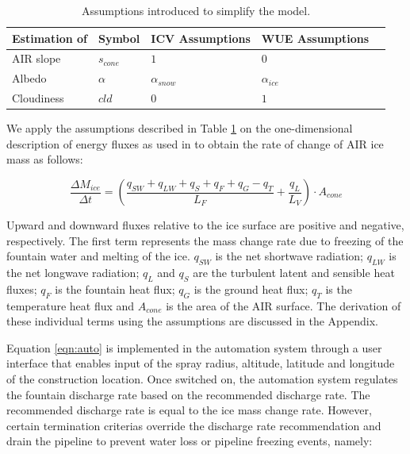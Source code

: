 \documentclass[tc, manuscript]{copernicus}
\begin{document}
\begin{table}[]
\centering
\caption{Assumptions introduced to simplify the model.}
\label{tab:assumptions}
\begin{tabular}{@{}lllll@{}}
\toprule
\textbf{Estimation of} & \textbf{Symbol} & \textbf{ICV Assumptions} & \textbf{WUE Assumptions} & \\ \midrule
\multicolumn{1}{|l}{AIR slope}        & $s_{cone}$ & $ 1 $ & $0$ & \multicolumn{1}{l|}{} \\ \midrule
\multicolumn{1}{|l}{Albedo} & $\alpha$ & $\alpha_{snow}$ & $\alpha_{ice}$ & \multicolumn{1}{l|}{} \\\midrule 
\multicolumn{1}{|l}{Cloudiness}  & $cld$ & $0$ & $1$ & \multicolumn{1}{l|}{} \\ \bottomrule
\end{tabular}
\end{table}

We apply the assumptions described in Table \ref{tab:assumptions} on the one-dimensional description of energy
fluxes as used in \cite{balasubramanianInfluenceMeteorologicalConditions2022} to obtain the rate of change of
AIR ice mass as follows: 

\begin{equation}
  \frac{\Delta M_{ice}}{\Delta t}  =  (\frac{q_{SW} + q_{LW} + q_{S} + q_{F} + q_{G} - q_{T}}{L_F} + \frac{q_{L}}{L_V} ) \cdot A_{cone}
	\label{eqn:auto}
\end{equation}

Upward and downward fluxes relative to the ice surface are positive and negative, respectively. The first term
represents the mass change rate due to freezing of the fountain water and melting of the ice. $q_{SW}$ is the
net shortwave radiation; $q_{LW}$ is the net longwave radiation; $q_{L}$ and $q_{S}$ are the turbulent latent
and sensible heat fluxes; $q_{F}$ is the fountain heat flux; $q_{G}$ is the ground heat flux; $q_{T}$ is the
temperature heat flux and $A_{cone}$ is the area of the AIR surface. The derivation of these individual terms
using the assumptions are discussed in the Appendix.

Equation \ref{eqn:auto} is implemented in the automation system through a user interface that enables input of
the spray radius, altitude, latitude and longitude of the construction location. Once switched on, the
automation system regulates the fountain discharge rate based on the recommended discharge rate. The recommended
discharge rate is equal to the ice mass change rate. However, certain termination criterias override the
discharge rate recommendation and drain the pipeline to prevent water loss or pipeline freezing events, namely: 
\end{document}
